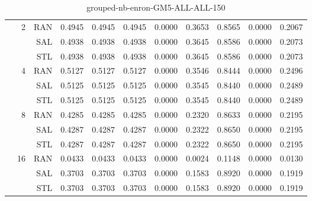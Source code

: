 \begin{center}
\begin{table}[htbp]
\begin{tabular}{ | r | r | r | r | r | r | r | r | r | r | r |}
 & \multirow{3}{*}{2} & RAN & 0.4945 & 0.4945 & 0.4945 & 0.0000 & 0.3653 & 0.8565 & 0.0000 & 0.2067\\ \cline{3-11}
 &   & SAL & 0.4938 & 0.4938 & 0.4938 & 0.0000 & 0.3645 & 0.8586 & 0.0000 & 0.2073\\ \cline{3-11}
 &   & STL & 0.4938 & 0.4938 & 0.4938 & 0.0000 & 0.3645 & 0.8586 & 0.0000 & 0.2073\\ \cline{2-11}
 & \multirow{3}{*}{4} & RAN & 0.5127 & 0.5127 & 0.5127 & 0.0000 & 0.3546 & 0.8444 & 0.0000 & 0.2496\\ \cline{3-11}
 &   & SAL & 0.5125 & 0.5125 & 0.5125 & 0.0000 & 0.3545 & 0.8440 & 0.0000 & 0.2489\\ \cline{3-11}
 &   & STL & 0.5125 & 0.5125 & 0.5125 & 0.0000 & 0.3545 & 0.8440 & 0.0000 & 0.2489\\ \cline{2-11}
 & \multirow{3}{*}{8} & RAN & 0.4285 & 0.4285 & 0.4285 & 0.0000 & 0.2320 & 0.8633 & 0.0000 & 0.2195\\ \cline{3-11}
 &   & SAL & 0.4287 & 0.4287 & 0.4287 & 0.0000 & 0.2322 & 0.8650 & 0.0000 & 0.2195\\ \cline{3-11}
 &   & STL & 0.4287 & 0.4287 & 0.4287 & 0.0000 & 0.2322 & 0.8650 & 0.0000 & 0.2195\\ \cline{2-11}
 & \multirow{3}{*}{16} & RAN & 0.0433 & 0.0433 & 0.0433 & 0.0000 & 0.0024 & 0.1148 & 0.0000 & 0.0130\\ \cline{3-11}
 &   & SAL & 0.3703 & 0.3703 & 0.3703 & 0.0000 & 0.1583 & 0.8920 & 0.0000 & 0.1919\\ \cline{3-11}
 &   & STL & 0.3703 & 0.3703 & 0.3703 & 0.0000 & 0.1583 & 0.8920 & 0.0000 & 0.1919\\ \cline{2-11}
\hline
\end{tabular}
\caption{grouped-nb-enron-GM5-ALL-ALL-150}
\end{table}
\end{center}

